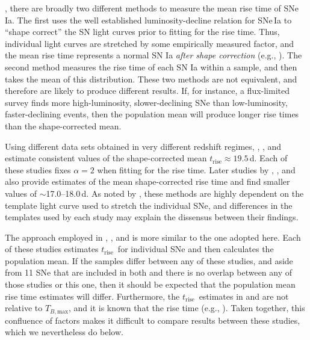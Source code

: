 \documentclass[twocolumn]{./aastex63}
\newcommand{\trise}{$t_\mathrm{rise}$}
\newcommand{\tbmax}{$T_{B,\mathrm{max}}$}
\begin{document}
, there are broadly two
different methods to measure the mean rise time of SNe\,Ia. The first uses the
well established luminosity-decline relation for SNe\,Ia \citep{Phillips93} to
``shape correct'' the SN light curves prior to fitting for the rise time.
Thus, individual light curves are stretched by some empirically measured
factor, and the mean rise time represents a normal SN Ia \textit{after shape
correction} (e.g.,
\citealt{Riess99a,Aldering00,Conley06,Hayden10,Ganeshalingam11}). The second
method measures the rise time of each SN Ia within a sample, and then takes
the mean of this distribution. These two methods are not equivalent, and
therefore are likely to produce different results. If, for instance, a
flux-limited survey finds more high-luminosity, slower-declining SNe than
low-luminosity, faster-declining events, then the population mean will produce
longer rise times than the shape-corrected mean.

Using different data sets obtained in very different redshift regimes,
\citet{Riess99a}, \citet{Aldering00}, and \citet{Conley06} estimate consistent
values of the shape-corrected mean \trise$ \approx 19.5$\,d. Each of these
studies fixes $\alpha = 2$ when fitting for the rise time.  Later studies by \citet{Hayden10},
\citet{Ganeshalingam11}, and \citet{Gonzalez-Gaitan12} also provide estimates
of the mean shape-corrected rise time and find smaller values of
$\sim$17.0--18.0\,d. As noted by \citeauthor{Hayden10}, these methods are
highly dependent on the template light curve used to stretch the individual
SNe, and differences in the templates used by each study may explain the
dissensus between their findings.

The approach employed in \citet{Firth15}, \citet{Zheng17a}, and
\citet{Papadogiannakis19} is more similar to the one adopted here. Each of
these studies estimates \trise\ for individual SNe and then calculates the
population mean. If the samples differ between any of these studies, and aside
from 11 SNe that are included in both \citet{Papadogiannakis19} and
\citet{Firth15} there is no overlap between any of those studies or this one,
then it should be expected that the population mean rise time estimates will
differ. Furthermore, the \trise\ estimates in \citet{Papadogiannakis19} and
\citet{Firth15} are not relative to \tbmax, and it is known that the rise time
 (e.g., \citealt{Ganeshalingam11}).
Taken together, this confluence of factors makes it difficult to compare
results between these studies, which we nevertheless do below.
\end{document}

